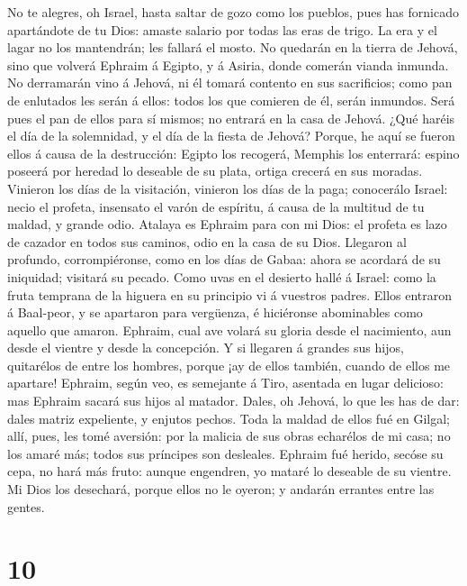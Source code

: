  No te alegres, oh Israel, hasta saltar de gozo como los
pueblos, pues has fornicado apartándote de tu Dios: amaste salario por
todas las eras de trigo.  La era y el lagar no los
mantendrán; les fallará el mosto.  No quedarán en la
tierra de Jehová, sino que volverá Ephraim á Egipto, y á Asiria, donde
comerán vianda inmunda.  No derramarán vino á Jehová, ni
él tomará contento en sus sacrificios; como pan de enlutados les serán á
ellos: todos los que comieren de él, serán inmundos. Será pues el pan de
ellos para sí mismos; no entrará en la casa de Jehová. 
¿Qué haréis el día de la solemnidad, y el día de la fiesta de Jehová?
 Porque, he aquí se fueron ellos á causa de la
destrucción: Egipto los recogerá, Memphis los enterrará: espino poseerá
por heredad lo deseable de su plata, ortiga crecerá en sus moradas.
 Vinieron los días de la visitación, vinieron los días de
la paga; conocerálo Israel: necio el profeta, insensato el varón de
espíritu, á causa de la multitud de tu maldad, y grande odio.
 Atalaya es Ephraim para con mi Dios: el profeta es lazo
de cazador en todos sus caminos, odio en la casa de su Dios.
 Llegaron al profundo, corrompiéronse, como en los días de
Gabaa: ahora se acordará de su iniquidad; visitará su pecado.
 Como uvas en el desierto hallé á Israel: como la fruta
temprana de la higuera en su principio vi á vuestros padres. Ellos
entraron á Baal-peor, y se apartaron para vergüenza, é hiciéronse
abominables como aquello que amaron.  Ephraim, cual ave
volará su gloria desde el nacimiento, aun desde el vientre y desde la
concepción.  Y si llegaren á grandes sus hijos,
quitarélos de entre los hombres, porque ¡ay de ellos también, cuando de
ellos me apartare!  Ephraim, según veo, es semejante á
Tiro, asentada en lugar delicioso: mas Ephraim sacará sus hijos al
matador.  Dales, oh Jehová, lo que les has de dar: dales
matriz expeliente, y enjutos pechos.  Toda la maldad de
ellos fué en Gilgal; allí, pues, les tomé aversión: por la malicia de
sus obras echarélos de mi casa; no los amaré más; todos sus príncipes
son desleales.  Ephraim fué herido, secóse su cepa, no
hará más fruto: aunque engendren, yo mataré lo deseable de su vientre.
 Mi Dios los desechará, porque ellos no le oyeron; y
andarán errantes entre las gentes.

\hypertarget{section-9}{%
\section{10}\label{section-9}}


